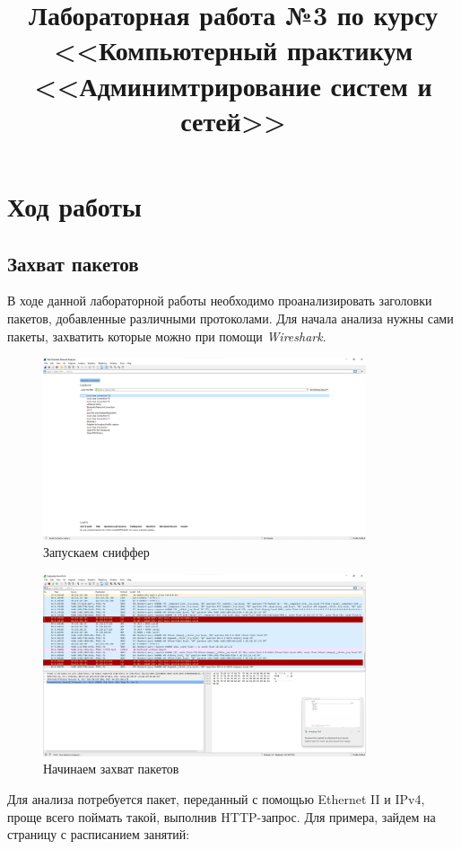 \documentclass[a4paper]{article}
\title{
  Лабораторная работа №3 по курсу \\
  <<Компьютерный практикум <<Админимтрирование систем и сетей>>  
}
\begin{document}
  \templatedtitlepage
  
  \toc
  \section{Ход работы}

  \subsection{Захват пакетов}

  В ходе данной лабораторной работы необходимо проанализировать заголовки
  пакетов, добавленные различными протоколами. Для начала анализа нужны сами
  пакеты, захватить которые можно при помощи \textit{Wireshark}.

  \begin{figure}[H]
    \centering
    \includegraphics[width=0.85\textwidth]{03_0001}
    \caption{Запускаем сниффер}
    \label{img:0001}
  \end{figure}

  \begin{figure}[H]
    \centering
    \includegraphics[width=0.85\textwidth]{03_0002}
    \caption{Начинаем захват пакетов}
    \label{img:0002}
  \end{figure}

  Для анализа потребуется пакет, переданный с помощью Ethernet II и IPv4, проще
  всего поймать такой, выполнив HTTP-запрос. Для примера, зайдем на страницу 
  с расписанием занятий:
  
\end{document}
